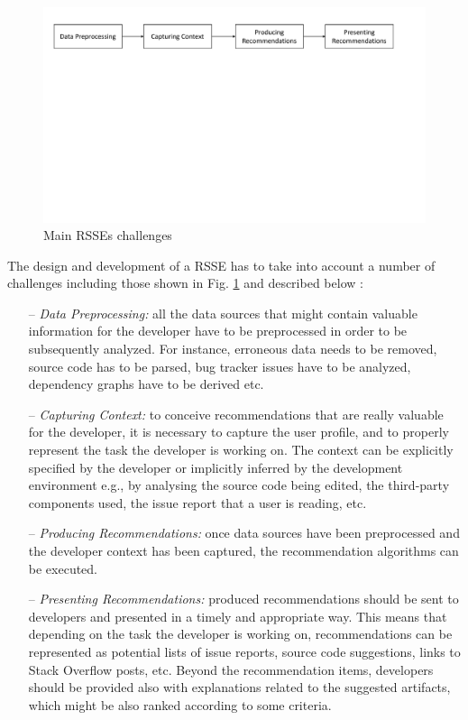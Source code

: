 \begin{figure}[h!]
	\centering
	\includegraphics[width=\linewidth]{images/rs-steps}
	\caption{Main RSSEs challenges}
	\label{fig:rs-steps}
\end{figure}

The design and development of a RSSE has to take into account a number of 
challenges including those shown in Fig. \ref{fig:rs-steps} and described below 
\cite{robillard_recommendation_2014}:

\begin{itemize}
	\item[--] \textit{Data Preprocessing:} all the data sources that might 
	contain valuable information for the developer have to be preprocessed in 
	order to be subsequently analyzed. For instance, erroneous data needs to be 
	removed, source code has to be parsed, bug tracker issues have to be 
	analyzed, dependency graphs have to be derived etc.
	\item[--] \textit{Capturing Context:} to conceive recommendations that are 
	really valuable for the developer, it is necessary to capture the user 
	profile, and to properly represent the task the developer is working on. 
	The context can be explicitly specified by the developer or implicitly 
	inferred by the development environment e.g., by analysing the source code 
	being edited, the third-party components used, the issue report that a user 
	is reading, etc. 
	\item[--] \textit{Producing Recommendations:} once data sources have been 
	preprocessed and the developer context has been captured, the 
	recommendation algorithms can be executed.
	\item[--] \textit{Presenting Recommendations:} produced recommendations 
	should be sent to developers and presented in a timely and appropriate way. 
	This means that depending on the task the developer is working on, 
	recommendations can be represented as potential lists of issue reports, 
	source code suggestions, links to Stack Overflow posts, etc. Beyond the 
	recommendation items, developers should be provided also with explanations 
	related to the suggested artifacts, which might be also ranked according to 
	some criteria.
\end{itemize}


